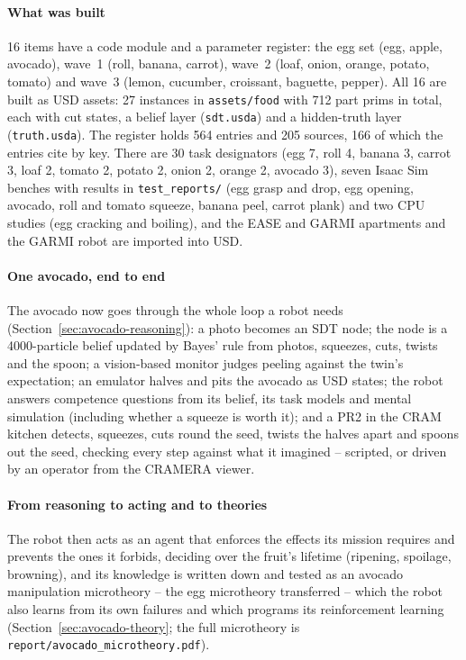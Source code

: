 \documentclass[10.5pt,a4paper]{article}
\begin{document}
\paragraph{What was built} 16 items have a code module and a parameter register: the egg set (egg, apple, avocado), wave~1 (roll, banana, carrot), wave~2 (loaf, onion, orange, potato, tomato) and wave~3 (lemon, cucumber, croissant, baguette, pepper). All 16 are built as USD assets: 27 instances in \texttt{assets/food} with 712 part prims in total, each with cut states, a belief layer
(\texttt{sdt.usda}) and a hidden-truth layer (\texttt{truth.usda}). The register holds 564 entries and 205 sources, 166 of which the entries cite by key. There are 30 task designators (egg 7, roll 4, banana 3, carrot 3, loaf 2, tomato 2, potato 2, onion 2, orange 2, avocado 3), seven
Isaac Sim benches with results in \texttt{test\_reports/} (egg grasp and drop, egg opening, avocado, roll and tomato
squeeze, banana peel, carrot plank) and two CPU studies (egg cracking and boiling), and the EASE and GARMI apartments
and the GARMI robot are imported into USD.
\paragraph{One avocado, end to end} The avocado now goes through the whole loop a robot needs
(Section~\ref{sec:avocado-reasoning}): a photo becomes an SDT node; the node is a 4000-particle belief updated by
Bayes' rule from photos, squeezes, cuts, twists and the spoon; a vision-based monitor judges peeling against the
twin's expectation; an emulator halves and pits the avocado as USD states; the robot answers competence questions
from its belief, its task models and mental simulation (including whether a squeeze is worth it); and a PR2 in the
CRAM kitchen detects, squeezes, cuts round the seed, twists the halves apart and spoons out the seed, checking every
step against what it imagined -- scripted, or driven by an operator from the CRAMERA viewer.

\paragraph{From reasoning to acting and to theories} The robot then acts as an agent that enforces the effects its
mission requires and prevents the ones it forbids, deciding over the fruit's lifetime (ripening, spoilage, browning),
and its knowledge is written down and tested as an avocado manipulation microtheory -- the egg microtheory transferred
-- which the robot also learns from its own failures and which programs its reinforcement learning
(Section~\ref{sec:avocado-theory}; the full microtheory is \texttt{report/avocado\_microtheory.pdf}).
\end{document}
